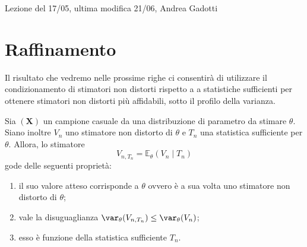 
Lezione del 17/05, ultima modifica 21/06, Andrea Gadotti


\section{Raffinamento}

Il risultato che vedremo nelle prossime righe ci consentirà di utilizzare
il condizionamento di stimatori non distorti rispetto a a statistiche
sufficienti per ottenere stimatori non distorti più affidabili, sotto il
profilo della varianza.

\begin{thm}
  Sia \((\mathbf{X})\) un campione casuale da una distribuzione di
  parametro da stimare \(\theta\).
  Siano inoltre \(V_n\) uno stimatore non distorto di \(\theta\) e \(T_n\) una statistica sufficiente per \(\theta\). Allora, lo stimatore
  \begin{equation}
    V_{n,T_n} = \mathbb{E}_{\theta}(V_n \mid T_n)
  \end{equation}
  gode delle seguenti proprietà:
  \begin{enumerate}
    \item il suo valore atteso corrisponde a \(\theta\) ovvero è a sua volta
    uno stimatore non distorto di \(\theta\);
    \item vale la disuguaglianza
      \(\var_{\theta}(V_{n,T_n}) \le \var_{\theta}(V_n)\);
    \item esso è funzione della statistica sufficiente \(T_n\).
  \end{enumerate}
\end{thm}
